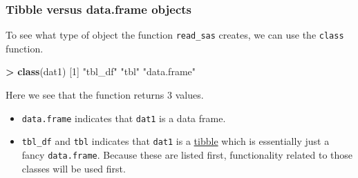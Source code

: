 \documentclass[
]{book}
\newenvironment{Shaded}{\begin{snugshade}}{\end{snugshade}}
\newcommand{\CommentTok}[1]{\textcolor[rgb]{0.56,0.35,0.01}{\textit{#1}}}
\newcommand{\ControlFlowTok}[1]{\textcolor[rgb]{0.13,0.29,0.53}{\textbf{#1}}}
\newcommand{\DecValTok}[1]{\textcolor[rgb]{0.00,0.00,0.81}{#1}}
\newcommand{\ErrorTok}[1]{\textcolor[rgb]{0.64,0.00,0.00}{\textbf{#1}}}
\newcommand{\KeywordTok}[1]{\textcolor[rgb]{0.13,0.29,0.53}{\textbf{#1}}}
\newcommand{\NormalTok}[1]{#1}
\newcommand{\OperatorTok}[1]{\textcolor[rgb]{0.81,0.36,0.00}{\textbf{#1}}}
\newcommand{\OtherTok}[1]{\textcolor[rgb]{0.56,0.35,0.01}{#1}}
\newcommand{\StringTok}[1]{\textcolor[rgb]{0.31,0.60,0.02}{#1}}
\providecommand{\tightlist}{%
  \setlength{\itemsep}{0pt}\setlength{\parskip}{0pt}}
\begin{document}
\begin{Shaded}
\end{Shaded}

\hypertarget{tibble-versus-data.frame-objects}{%
\subsubsection{Tibble versus data.frame objects}\label{tibble-versus-data.frame-objects}}

To see what type of object the function \texttt{read\_sas} creates, we can use the \texttt{class} function.

\begin{Shaded}
\begin{Highlighting}[]
\OperatorTok{>}\StringTok{ }\KeywordTok{class}\NormalTok{(dat1)}
\NormalTok{[}\DecValTok{1}\NormalTok{] }\StringTok{"tbl_df"}     \StringTok{"tbl"}        \StringTok{"data.frame"}
\end{Highlighting}
\end{Shaded}

Here we see that the function returns 3 values.

\begin{itemize}
\tightlist
\item
  \texttt{data.frame} indicates that \texttt{dat1} is a data frame.
\item
  \texttt{tbl\_df} and \texttt{tbl} indicates that \texttt{dat1} is a \href{http://r4ds.had.co.nz/tibbles.html}{tibble} which is essentially just a fancy \texttt{data.frame}. Because these are listed first, functionality related to those classes will be used first.
\end{itemize}
\end{document}
